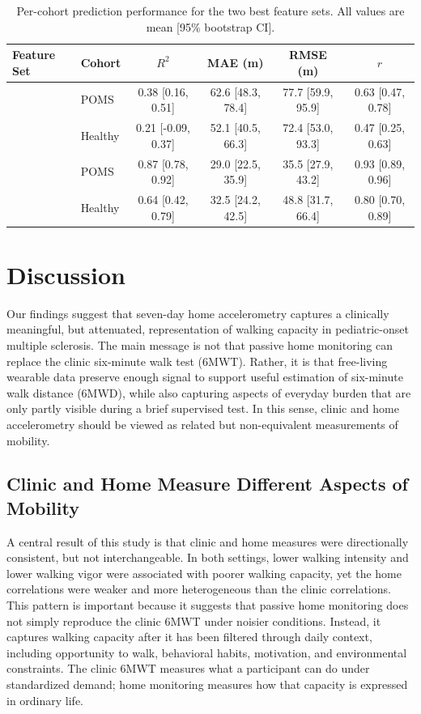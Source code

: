 \documentclass{article}
\begin{document}
\begin{table}[!ht]
\centering
\caption{Per-cohort prediction performance for the two best feature sets. All values are mean [95\% bootstrap CI].}
\label{tab:error}
\small
\begin{tabular}{@{}llcccc@{}}
\toprule
Feature Set & Cohort & $R^2$ & MAE (m) & RMSE (m) & $r$ \\
\midrule
{}
  & POMS    & 0.38 [0.16, 0.51] & 62.6 [48.3, 78.4] & 77.7 [59.9, 95.9] & 0.63 [0.47, 0.78] \\
  & Healthy & 0.21 [-0.09, 0.37] & 52.1 [40.5, 66.3] & 72.4 [53.0, 93.3] & 0.47 [0.25, 0.63] \\
\midrule
{}
  & POMS    & 0.87 [0.78, 0.92] & 29.0 [22.5, 35.9] & 35.5 [27.9, 43.2] & 0.93 [0.89, 0.96] \\
  & Healthy & 0.64 [0.42, 0.79] & 32.5 [24.2, 42.5] & 48.8 [31.7, 66.4] & 0.80 [0.70, 0.89] \\
\bottomrule
\end{tabular}
\end{table}


\section{Discussion}

Our findings suggest that seven-day home accelerometry captures a clinically meaningful, but attenuated, representation of walking capacity in pediatric-onset multiple sclerosis. The main message is not that passive home monitoring can replace the clinic six-minute walk test (6MWT). Rather, it is that free-living wearable data preserve enough signal to support useful estimation of six-minute walk distance (6MWD), while also capturing aspects of everyday burden that are only partly visible during a brief supervised test. In this sense, clinic and home accelerometry should be viewed as related but non-equivalent measurements of mobility.

\subsection{Clinic and Home Measure Different Aspects of Mobility}

A central result of this study is that clinic and home measures were directionally consistent, but not interchangeable. In both settings, lower walking intensity and lower walking vigor were associated with poorer walking capacity, yet the home correlations were weaker and more heterogeneous than the clinic correlations. This pattern is important because it suggests that passive home monitoring does not simply reproduce the clinic 6MWT under noisier conditions. Instead, it captures walking capacity after it has been filtered through daily context, including opportunity to walk, behavioral habits, motivation, and environmental constraints. The clinic 6MWT measures what a participant can do under standardized demand; home monitoring measures how that capacity is expressed in ordinary life.
\end{document}
